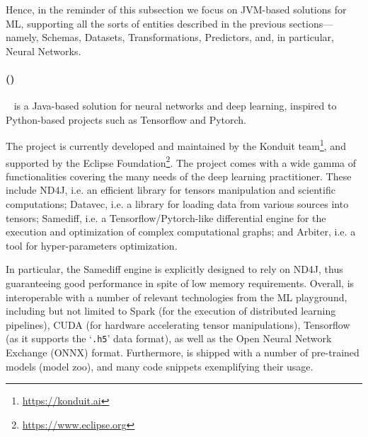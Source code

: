 \documentclass[12pt,a4paper,openright,twoside]{book}
\begin{document}
Hence, in the reminder of this subsection we focus on JVM-based solutions for ML, supporting all the sorts of entities described in the previous sections---namely, Schemas, Datasets, Transformations, Predictors, and, in particular, Neural Networks.

\paragraph{\deeplearningforj{} (\dlfj)}

\dlfj~\cite{DL4J} is a Java-based solution for neural networks and deep learning, inspired to Python-based projects such as Tensorflow and Pytorch.

The project is currently developed and maintained by the Konduit team\footnote{\url{https://konduit.ai}}, and supported by the Eclipse Foundation\footnote{\url{https://www.eclipse.org}}.
%
%
The project comes with a wide gamma of functionalities covering the many needs of the deep learning practitioner.
%
These include ND4J, i.e. an efficient library for tensors manipulation and scientific computations; Datavec, i.e. a library for loading data from various sources into tensors; Samediff, i.e. a Tensorflow/Pytorch-like differential engine for the execution and optimization of complex computational graphs; and Arbiter, i.e. a tool for hyper-parameters optimization.

In particular, the Samediff engine is explicitly designed to rely on ND4J, thus guaranteeing good performance in spite of low memory requirements.
%
Overall, \dlfj{} is interoperable with a number of relevant technologies from the ML playground, including but not limited to Spark (for the execution of distributed learning pipelines), CUDA (for hardware accelerating tensor manipulations), Tensorflow (as it supports the `\texttt{.h5}' data format), as well as the Open Neural Network Exchange (ONNX) format.
%
Furthermore, \dlfj{} is shipped with a number of pre-trained models (model zoo), and many code snippets exemplifying their usage.
\end{document}
